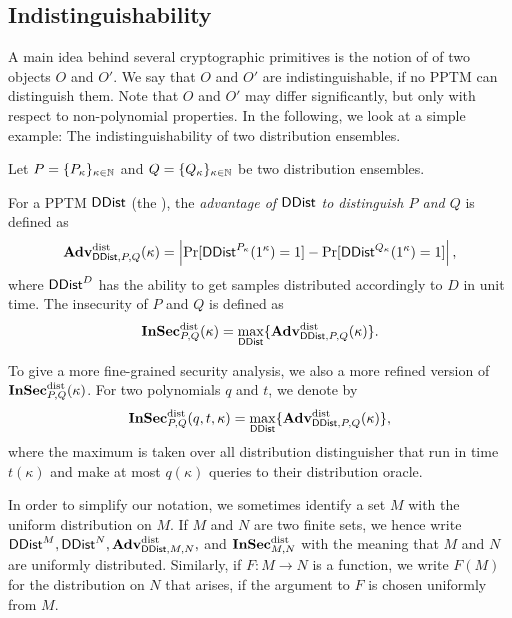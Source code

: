 \subsection*{Indistinguishability}
A main idea behind several cryptographic primitives is the notion of
 of two objects $O$ and $O'$. We say that
$O$ and $O'$ are indistinguishable, if no \ac{PPTM} can distinguish
them. Note that $O$ and $O'$ may differ significantly, but only with
respect to non-polynomial properties. In the following, we look at a
simple example: The indistinguishability of two distribution ensembles. 

Let $P=\{P_{\kappa}\}_{\kappa\in \mathbb{N}}$ and
$Q=\{Q_{\kappa}\}_{\kappa\in \mathbb{N}}$ be two distribution ensembles. 

For a \ac{PPTM} $\operatorname{\mathsf{DDist}}$ (the ), the
\emph{advantage of $\operatorname{\mathsf{DDist}}$ to distinguish $P$ and $Q$} is defined as
\begin{align*}
\operatorname{\mathbf{Adv}}^{\operatorname{dist}}_{\operatorname{\mathsf{DDist}},P,Q}(\kappa)=\left|\Pr[\operatorname{\mathsf{DDist}}^{P_{\kappa}}(1^{\kappa})=1]-\Pr[\operatorname{\mathsf{DDist}}^{Q_{\kappa}}(1^{\kappa})=1]\right|,
\end{align*}
where $\operatorname{\mathsf{DDist}}^{D}$ has the ability to get samples distributed accordingly to
$D$ in unit time. The insecurity of $P$ and $Q$ is defined as
\begin{align*}
   \operatorname{\mathbf{InSec}}_{P,Q}^{\operatorname{dist}}(\kappa) = \max_{\operatorname{\mathsf{DDist}}}\{\operatorname{\mathbf{Adv}}_{\operatorname{\mathsf{DDist}},P,Q}^{\operatorname{dist}}(\kappa)\}.
\end{align*}

To give a more fine-grained security analysis, we also a more refined
version of $\operatorname{\mathbf{InSec}}_{P,Q}^{\operatorname{dist}}(\kappa)$. For two polynomials $q$ and
$t$, we denote by 
\begin{align*}
   \operatorname{\mathbf{InSec}}_{P,Q}^{\operatorname{dist}}(q,t,\kappa) = \max_{\operatorname{\mathsf{DDist}}}\{\operatorname{\mathbf{Adv}}_{\operatorname{\mathsf{DDist}},P,Q}^{\operatorname{dist}}(\kappa)\},
\end{align*}
where the maximum is taken over all distribution distinguisher that run
in time $t(\kappa)$ and make at most $q(\kappa)$ queries to their
distribution oracle. 



 In order to simplify our notation, we sometimes
identify a set $M$ with the uniform distribution on $M$. If $M$ and $N$
are two finite sets, we hence write
$ \operatorname{\mathsf{DDist}}^{M},\operatorname{\mathsf{DDist}}^{N}, \operatorname{\mathbf{Adv}}^{\operatorname{dist}}_{\operatorname{\mathsf{DDist}},M,N},$ and $\operatorname{\mathbf{InSec}}_{M,N}^{\operatorname{dist}}$ with the
meaning that $M$ and $N$ are uniformly distributed. Similarly, if
$F\colon M\to N$ is a function, we write $F(M)$ for the distribution on $N$
that arises, if the argument to $F$ is chosen uniformly from $M$. 

